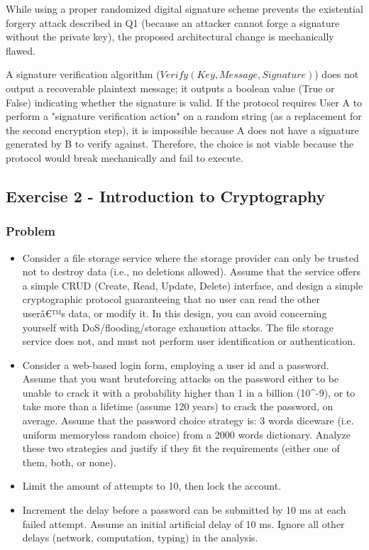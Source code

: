 \documentclass{article}
\begin{document}
While using a proper randomized digital signature scheme prevents the existential forgery attack described in Q1 (because an attacker cannot forge a signature without the private key), the proposed architectural change is mechanically flawed.

A signature verification algorithm ($Verify(Key, Message, Signature)$) does not output a recoverable plaintext message; it outputs a boolean value (True or False) indicating whether the signature is valid.
If the protocol requires User A to perform a "signature verification action" on a random string (as a replacement for the second encryption step), it is impossible because A does not have a signature generated by B to verify against. Therefore, the choice is not viable because the protocol would break mechanically and fail to execute.

\subsection{Exercise 2 - Introduction to Cryptography}
\subsubsection*{Problem}
\begin{itemize}
    \item[\textbf{1.}] [4 points] Consider a file storage service where the storage provider can only be trusted not to destroy data (i.e., no deletions allowed). Assume that the service offers a simple CRUD (Create, Read, Update, Delete) interface, and design a simple cryptographic protocol guaranteeing that no user can read the other userâ€™s data, or modify it. In this design, you can avoid concerning yourself with DoS/flooding/storage exhaustion attacks. The file storage service does not, and must not perform user identification or authentication.
    \item[\textbf{2.}] [3 points] Consider a web-based login form, employing a user id and a password. Assume that you want bruteforcing attacks on the password either to be unable to crack it with a probability higher than 1 in a billion (10\textasciicircum{}-9), or to take more than a lifetime (assume 120 years) to crack the password, on average. Assume that the password choice strategy is: 3 words diceware (i.e. uniform memoryless random choice) from a 2000 words dictionary. Analyze these two strategies and justify if they fit the requirements (either one of them, both, or none).
    \item[\textbf{1.}] Limit the amount of attempts to 10, then lock the account.
    \item[\textbf{2.}] Increment the delay before a password can be submitted by 10 ms at each failed attempt. Assume an initial artificial delay of 10 ms. Ignore all other delays (network, computation, typing) in the analysis.
\end{itemize}
\end{document}
